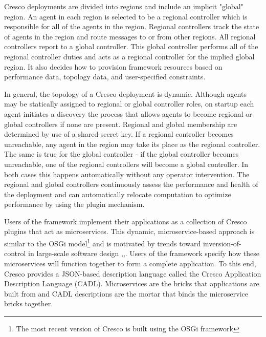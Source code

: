 \documentclass{acmart}
\begin{document}
	Cresco deployments are divided into regions and include an implicit "global" region. An agent in each region is selected to be a regional controller which is responsible for all of the agents in the region. Regional controllers track the state of  agents in the region and route messages to or from other regions. All regional controllers report to a global controller. This global controller performs all of the regional controller duties and acts as a regional controller for the implied global region. It also decides how to provision framework resources based on performance data, topology data, and user-specified constraints.
	
	In general, the topology of a Cresco deployment is dynamic. Although agents may be statically assigned to regional or global controller roles, on startup each agent initiates a discovery the process that allows agents to become regional or global controllers if none are present. Regional and global membership are determined by use of a shared secret key. If a regional controller becomes unreachable, any agent in the region may take its place as the regional controller. The same is true for the global controller - if the global controller becomes unreachable, one of the regional controllers will become a global controller. In both cases this happens automatically without any operator intervention. The regional and global controllers continuously assess the performance and health of the deployment and can automatically relocate computation to optimize performance by using the plugin mechanism.
	
    Users of the framework implement their applications as a collection of Cresco plugins that act as microservices. This dynamic, microservice-based approach is similar to the OSGi model\footnote{The most recent version of Cresco is built using the OSGi framework} and is motivated by trends toward inversion-of-control in large-scale software design \cite{osgi},\cite{spring},\cite{kubernetes}. Users of the framework specify how these microservices will function together to form a complete application. To this end, Cresco provides a JSON-based description language called the Cresco Application Description Language (CADL). Microservices are the bricks that applications are built from and CADL descriptions are the mortar that binds the microservice bricks together.
    
\end{document}
